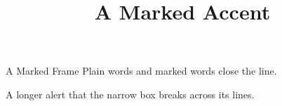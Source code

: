 \documentclass{slides}
\title{A Marked Accent}
\begin{document}
\begin{frame}{A Marked Frame}
Plain words and \alert{marked words} close the line.

\begin{minipage}{4cm}
\alert{A longer alert that the narrow box breaks across its lines.}
\end{minipage}
\end{frame}
\end{document}
